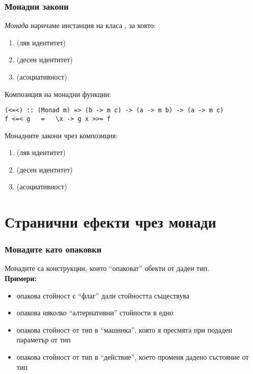 \documentclass[alsotrans]{beamerswitch}
\begin{document}
\begin{frame}[fragile]
  \frametitle{Монадни закони}
  \begin{definition}
    \emph{Монада} наричаме инстанция на класа , за която:
    \small
    \begin{enumerate}[<+->]
    \item {} \eqv {} (ляв идентитет)
    \item {}   \eqv {}   (десен идентитет)
    \item {} \eqv {} (асоциативност)
    \end{enumerate}
  \end{definition}
  \onslide<+->
  Композиция на монадни функции:\\
\begin{lstlisting}
(<=<) :: (Monad m) => (b -> m c) -> (a -> m b) -> (a -> m c)  
f <=< g   =   \x -> g x >>= f
\end{lstlisting}
  \onslide<+->
  Монадните закони чрез композиция:
  \begin{enumerate}
  \item {} \eqv {} (ляв идентитет)
  \item {} \eqv {} (десен идентитет)
  \item {} \eqv {} (асоциативност)
  \end{enumerate}
\end{frame}

\section{Странични ефекти чрез монади}

\begin{frame}
  \frametitle{Монадите като опаковки}
  Монадите са конструкции, които ``опаковат'' обекти от даден тип.\pause\\[2ex]
  \textbf{Примери:}
  \begin{itemize}[<+->]
  \item {} опакова стойност с ``флаг'' дали стойността съществува
  \item \lst{[a]} опакова няколко ``алтернативни'' стойности в едно
  \item {} опакова стойност от тип  в ``машинка'', която я пресмята при подаден параметър от тип 
  \item {} опакова стойност от тип  в ``действие'', което променя дадено състояние от тип 
  \end{itemize}
\end{frame}
\end{document}
